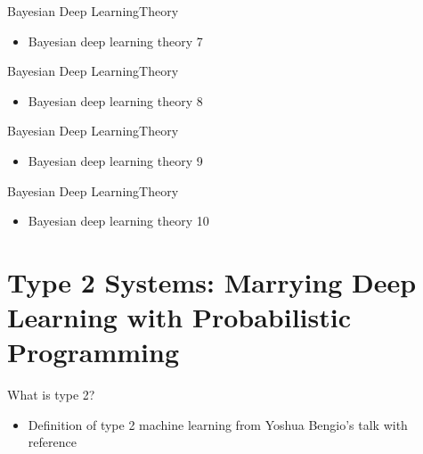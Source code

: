 \documentclass[AERbeamer%
              ,optEnglish%
              ,optBiber%
              ,optBibstyleAlphabetic%
              ,optBeamerClassicFormat%
              ]{AERlatex}%
\begin{document}
\begin{frame}[c]{Bayesian Deep Learning}{Theory}
    \centering
    \begin{itemize}
        \item Bayesian deep learning theory 7
    \end{itemize}
\end{frame}


\begin{frame}[c]{Bayesian Deep Learning}{Theory}
    \centering
    \begin{itemize}
        \item Bayesian deep learning theory 8
    \end{itemize}
\end{frame}


\begin{frame}[c]{Bayesian Deep Learning}{Theory}
    \centering
    \begin{itemize}
        \item Bayesian deep learning theory 9
    \end{itemize}
\end{frame}


\begin{frame}[c]{Bayesian Deep Learning}{Theory}
    \centering
    \begin{itemize}
        \item Bayesian deep learning theory 10
    \end{itemize}
\end{frame}



\section{Type 2 Systems: Marrying Deep Learning with Probabilistic Programming}

\begin{frame}[c]{What is type 2?}
    \centering
    \begin{itemize}
        \item Definition of type 2 machine learning from Yoshua Bengio's talk with reference
    \end{itemize}
\end{frame}
\end{document}
